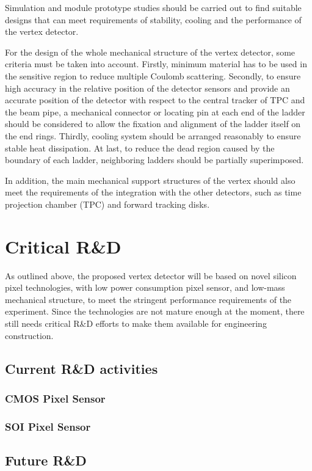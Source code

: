 Simulation and module prototype studies should be carried out to find suitable designs that can meet requirements of stability, cooling and the performance of the vertex detector. 


For the design of the whole mechanical structure of the vertex detector, some criteria must be taken into account. Firstly, minimum material has to be used in the sensitive region to reduce multiple Coulomb scattering. Secondly, to ensure high accuracy in the relative position of the detector sensors and provide an accurate position of the detector with respect to the central tracker of TPC and the beam pipe, a mechanical connector or locating pin at each end of the ladder should be considered to allow the fixation and alignment of the ladder itself on the end rings. Thirdly, cooling system should be arranged reasonably to ensure stable heat dissipation. At last, to reduce the dead region caused by the boundary of each ladder, neighboring ladders should be partially superimposed. 


In addition, the main mechanical support structures of the vertex should also meet the requirements of the integration with the other detectors, such as time projection chamber (TPC) and forward tracking disks. 


\section{Critical R\&D}

As outlined above, the proposed vertex detector will be based on novel silicon pixel technologies, with low power consumption pixel sensor, and low-mass mechanical structure, to meet the stringent performance requirements of the experiment. Since the technologies are not mature enough at the moment, there still needs critical R\&D efforts to make them available for engineering construction. 

\subsection{Current R\&D activities}
\subsubsection{CMOS Pixel Sensor}
\subsubsection{SOI Pixel Sensor}

\subsection{Future R\&D}

